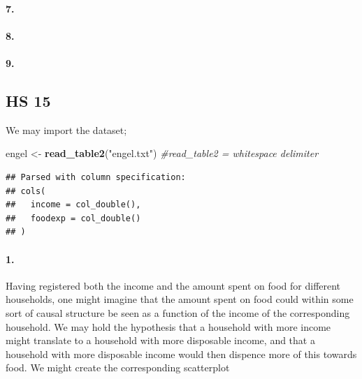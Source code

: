 \documentclass[
]{article}
\newenvironment{Shaded}{\begin{snugshade}}{\end{snugshade}}
\newcommand{\CommentTok}[1]{\textcolor[rgb]{0.56,0.35,0.01}{\textit{#1}}}
\newcommand{\KeywordTok}[1]{\textcolor[rgb]{0.13,0.29,0.53}{\textbf{#1}}}
\newcommand{\NormalTok}[1]{#1}
\newcommand{\StringTok}[1]{\textcolor[rgb]{0.31,0.60,0.02}{#1}}
\begin{document}
\hypertarget{section-69}{%
\paragraph{\texorpdfstring{\textbf{7.}}{7.}}\label{section-69}}

\hypertarget{section-70}{%
\paragraph{\texorpdfstring{\textbf{8.}}{8.}}\label{section-70}}

\hypertarget{section-71}{%
\paragraph{\texorpdfstring{\textbf{9.}}{9.}}\label{section-71}}

\hypertarget{hs-15}{%
\subsection{HS 15}\label{hs-15}}

We may import the dataset;

\begin{Shaded}
\begin{Highlighting}[]
\NormalTok{engel <-}\StringTok{ }\KeywordTok{read_table2}\NormalTok{(}\StringTok{"engel.txt"}\NormalTok{) }\CommentTok{#read_table2 = whitespace delimiter}
\end{Highlighting}
\end{Shaded}

\begin{verbatim}
## Parsed with column specification:
## cols(
##   income = col_double(),
##   foodexp = col_double()
## )
\end{verbatim}

\hypertarget{section-72}{%
\paragraph{\texorpdfstring{\textbf{1.}}{1.}}\label{section-72}}

Having registered both the income and the amount spent on food for
different households, one might imagine that the amount spent on food
could within some sort of causal structure be seen as a function of the
income of the corresponding household. We may hold the hypothesis that a
household with more income might translate to a household with more
disposable income, and that a household with more disposable income
would then dispence more of this towards food. We might create the
corresponding scatterplot
\end{document}
